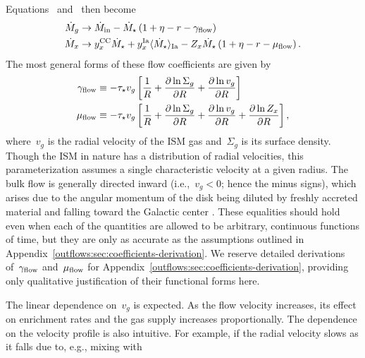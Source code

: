 Equations~
and~ then become
\begin{subequations}\begin{align}
\dot{M}_{g} &\rightarrow \dot{M}_\text{in} - \dot{M}_\star
\left(1 + \eta - r - \gamma_{\text{flow}}\right)
\\
\dot{M}_x &\rightarrow y_\text{$x$}^\text{CC} \dot{M}_\star +
y_\text{$x$}^\text{Ia} \langle \dot{M}_\star \rangle_\text{Ia} -
Z_x \dot{M}_\star \left(1 + \eta - r - \mu_{\text{flow}}\right).
\end{align}\end{subequations}
The most general forms of these flow coefficients are given by
\begin{subequations}\begin{align}
\gamma_{\text{flow}} &\equiv -\tau_\star v_g \left[
\frac{1}{R} +
\frac{\partial \ln \Sigma_g}{\partial R} +
\frac{\partial \ln v_g}{\partial R}
\right]
\label{outflows:eq:gamma-flow-general}
\\
\mu_{\text{flow}} &\equiv -\tau_\star v_g \left[
\frac{1}{R} + \frac{\partial \ln \Sigma_g}{\partial R} +
\frac{\partial \ln v_g}{\partial R} +
\frac{\partial \ln Z_x}{\partial R}
\right],
\label{outflows:eq:mu-flow-general}
\end{align}\end{subequations}
where~$v_g$ is the radial velocity of the ISM gas and~$\Sigma_g$ is its surface
density.
Though the ISM in nature has a distribution of radial velocities, this
parameterization assumes a single characteristic velocity at a given radius.
The bulk flow is generally directed inward (i.e.,~$v_g < 0$; hence the minus
signs), which arises due to the angular momentum of the disk being diluted by
freshly accreted material and falling toward the Galactic center
\citep[see discussion in, e.g.,][]{Bilitewski2012}.
These equalities should hold even when each of the quantities are allowed to be
arbitrary, continuous functions of time, but they are only as accurate as the
assumptions outlined in Appendix~\ref{outflows:sec:coefficients-derivation}.
We reserve detailed derivations of~$\gamma_{\text{flow}}$ and~$\mu_{\text{flow}}$ for
Appendix~\ref{outflows:sec:coefficients-derivation}, providing only
qualitative justification of their functional forms here.
\par
The linear dependence on~$v_g$ is expected.
As the flow velocity increases, its effect on enrichment rates and the gas
supply increases proportionally.
The dependence on the velocity profile is also intuitive.
For example, if the radial velocity slows as it falls due to, e.g., mixing with
